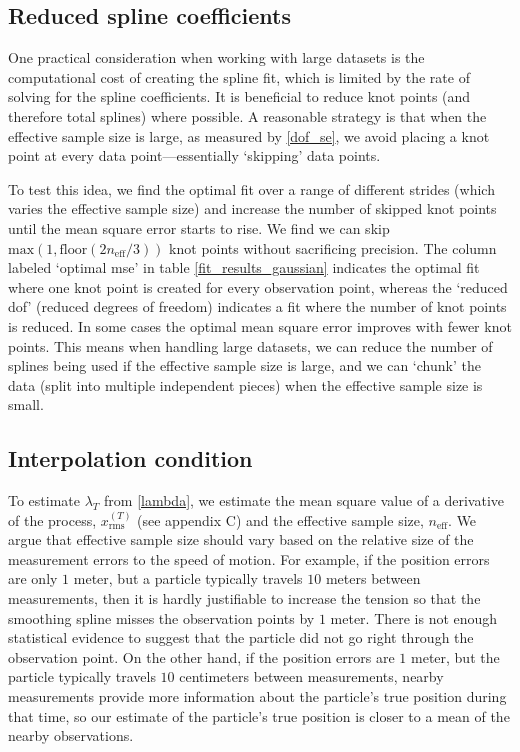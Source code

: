 \documentclass{ametsoc}
\begin{document}
\subsection{Reduced spline coefficients}
\label{subsec:reduced_coefficients}

One practical consideration when working with large datasets is the computational cost of creating the spline fit, which is limited by the rate of solving for the spline coefficients. It is beneficial to reduce knot points (and therefore total splines) where possible. A reasonable strategy is that when the effective sample size is large, as measured by \eqref{dof_se}, we avoid placing a knot point at every data point---essentially `skipping' data points.

To test this idea, we find the optimal fit over a range of different strides (which varies the effective sample size) and increase the number of skipped knot points until the mean square error starts to rise. We find we can skip $\textrm{max}(1,\textrm{floor}(2n_{\textrm{eff}}/3))$ knot points without sacrificing precision. The column labeled `optimal mse' in table  \ref{fit_results_gaussian} indicates the optimal fit where one knot point is created for every observation point, whereas the `reduced dof' (reduced degrees of freedom) indicates a fit where the number of knot points is reduced. In some cases the optimal mean square error improves with fewer knot points. This means when handling large datasets, we can reduce the number of splines being used if the effective sample size is large, and we can `chunk' the data (split into multiple independent pieces) when the effective sample size is small.

\subsection{Interpolation condition}
\label{subsec:interpolation_condition}

To estimate $\lambda_T$ from \eqref{lambda}, we estimate the mean square value of a derivative of the process, $x_{\textrm{rms}}^{(T)}$ (see appendix C) and the effective sample size, $n_{\textrm{eff}}$. We argue that effective sample size should vary based on the relative size of the measurement errors to the speed of motion. For example, if the position errors are only $1$ meter, but a particle typically travels $10$ meters between measurements, then it is hardly justifiable to increase the tension so that the smoothing spline misses the observation points by $1$ meter. There is not enough statistical evidence to suggest that the particle did not go right through the observation point. On the other hand, if the position errors are $1$ meter, but the particle typically travels $10$ centimeters between measurements, nearby measurements provide more information about the particle's true position during that time, so our estimate of the particle's true position is closer to a mean of the nearby observations.
\end{document}
